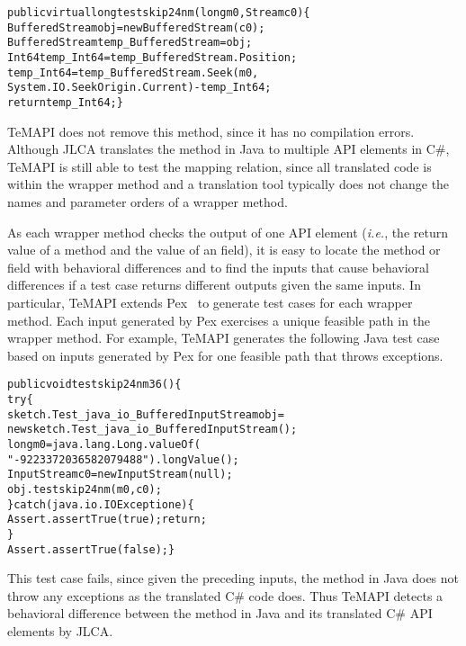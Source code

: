 \begin{CodeOut}
\begin{alltt}
public virtual long testskip24nm(long m0, Stream c0)\{
  BufferedStream obj = new BufferedStream(c0);
  BufferedStream temp_BufferedStream = obj;
  Int64 temp_Int64 = temp_BufferedStream.Position;
  temp_Int64 = temp_BufferedStream.Seek(m0,
       System.IO.SeekOrigin.Current) - temp_Int64;
  return temp_Int64;\}
\end{alltt}
\end{CodeOut}\vspace*{-2ex}

TeMAPI does not remove this method, since it has no compilation errors. Although JLCA translates the  method in Java to multiple API elements in C\#, TeMAPI is still able to test the mapping relation, since all translated code is within the wrapper method and a translation tool typically does not change the names and parameter orders of a wrapper method.

As each wrapper method checks the output of one API element (\emph{i.e.}, the return value of a method and the value of an field), it is easy to locate the method or field with behavioral differences and to find the inputs that cause behavioral differences if a test case returns different outputs given the same inputs. In particular, TeMAPI extends Pex~\cite{tillmann2008pex} to generate test cases for each wrapper method. Each input generated by Pex exercises a unique feasible path in the wrapper method. For example, TeMAPI generates the following Java test case based on inputs generated by Pex for one feasible path that throws exceptions.

\begin{CodeOut}\vspace*{-1ex}
\begin{alltt}
public void testskip24nm36()\{
  try\{
     sketch.Test_java_io_BufferedInputStream obj =
        new sketch.Test_java_io_BufferedInputStream();
     long m0 = java.lang.Long.valueOf(
                  "-9223372036582079488").longValue();
     InputStream c0 = new InputStream(null);
     obj.testskip24nm(m0,c0);
  \}catch(java.io.IOException e)\{
     Assert.assertTrue(true);return;
  \}
  Assert.assertTrue(false);\}
\end{alltt}
\end{CodeOut}\vspace*{-2ex}

This test case fails, since given the preceding inputs, the  method in Java does not throw any exceptions as the translated C\# code does. Thus TeMAPI detects a behavioral difference between the  method in Java and its translated C\# API elements by JLCA.

